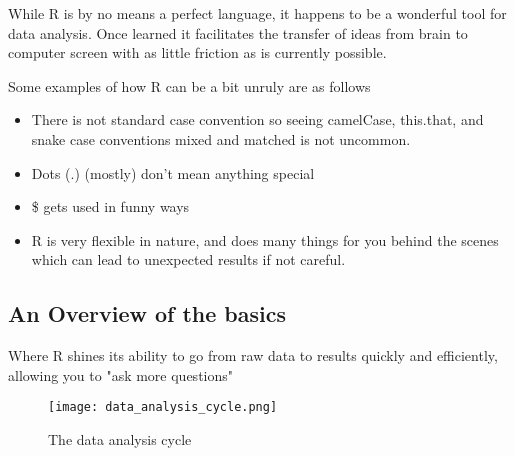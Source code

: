 While R is by no means a perfect language, it happens to be a wonderful tool for data analysis. Once learned it facilitates the transfer of ideas from brain to computer screen with as little friction as is currently possible.

\begin{flushleft}
Some examples of how R can be a bit unruly are as follows
\end{flushleft}

\begin{itemize}
    \item There is not standard case convention so seeing camelCase, this.that, and snake case conventions mixed and matched is not uncommon.
    \item Dots (.) (mostly) don’t mean anything special
    \item \$ gets used in funny ways
    \item R is very flexible in nature, and does many things for you behind the scenes which can lead to unexpected results if not careful. 
\end{itemize}

\subsection{An Overview of the basics}

\begin{flushleft}
Where R shines its ability to go from raw data to results quickly and efficiently, allowing you to "ask more questions"
\end{flushleft}

\begin{figure}[H]
    \centering
    \texttt{[image: data\_analysis\_cycle.png]}
    \caption{The data analysis cycle}
    \label{fig:data_analysis_cycle}
\end{figure}

